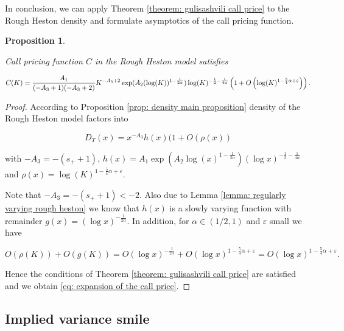 \documentclass[12pt,twoside]{article}
\theoremstyle{plain}
\theoremstyle{plain}
\newtheorem{proposition}{Proposition}[section]
\theoremstyle{definition}
\theoremstyle{remark}
\numberwithin{equation}{section}
\begin{document}
In conclusion, we can apply Theorem \ref{theorem: gulisashvili call price} to the Rough Heston density and formulate asymptotics of the call pricing function.

\begin{proposition}
\label{prop: call price asymptotic}

Call pricing function $C$ in the Rough Heston model satisfies

\begin{equation}
\footnotesize
\label{eq: expansion of the call price}
C(K) = \frac{A_1}{(-A_3+1)(-A_3+2)} K^{-A_3+2} \exp(A_2 (\log (K)) ^ {1-\frac{1}{2\alpha}}) \log(K) ^ {-\frac 12 - \frac{1}{4\alpha}} \left(1+O\left(\log (K)^{1-\frac{5}{4} \alpha+\varepsilon}\right)\right).
\end{equation}

\end{proposition}

\begin{proof}

According to Proposition \ref{prop: density main proposition} density of the Rough Heston model factors into

$$
D_T(x) = x^{-A_3} h(x) (1+O(\rho(x))
$$

\vspace{5pt}

with $-A_3 = -(s_+ + 1)$, $h(x) = A_1 \exp \left(A_{2} \log (x)^{1-\frac{1}{2 \alpha}}\right)(\log x)^{-\frac{1}{2}-\frac{1}{4 \alpha}}$ and $\rho(x) = \log (K)^{1-\frac{5}{4} \alpha+\varepsilon}$.

Note that $-A_3 = -(s_+ + 1) < -2$. Also due to Lemma \ref{lemma: regularly varying rough heston} we know that $h(x)$ is a slowly varying function with remainder $g(x) = (\log x)^{-\frac{1}{2\alpha}}$. In addition, for $\alpha \in(1/2, 1)$ and $\varepsilon$ small we have

$$
O(\rho(K)) + O(g(K)) = O(\log x)^{-\frac{1}{2\alpha}} + O(\log x)^{1-\frac{5}{4}\alpha + \varepsilon} = O(\log x)^{1-\frac{5}{4}\alpha + \varepsilon}.
$$

Hence the conditions of Theorem \ref{theorem: gulisashvili call price} are satisfied and we obtain \eqref{eq: expansion of the call price}.

\end{proof}

\subsection{Implied variance smile}
\end{document}
